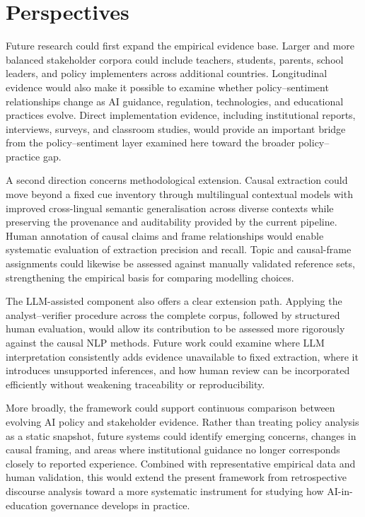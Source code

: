 \section{Perspectives}

Future research could first expand the empirical evidence base. Larger and more
balanced stakeholder corpora could include teachers, students, parents, school
leaders, and policy implementers across additional countries. Longitudinal evidence
would also make it possible to examine whether policy--sentiment relationships change
as AI guidance, regulation, technologies, and educational practices evolve. Direct
implementation evidence, including institutional reports, interviews, surveys, and
classroom studies, would provide an important bridge from the policy--sentiment layer
examined here toward the broader policy--practice gap.

A second direction concerns methodological extension. Causal extraction could move
beyond a fixed cue inventory through multilingual contextual models with improved
cross-lingual semantic generalisation across diverse contexts while preserving the
provenance and auditability provided by the current pipeline. Human annotation of
causal claims and frame relationships would enable systematic evaluation of
extraction precision and recall. Topic and causal-frame assignments could likewise
be assessed against manually validated reference sets, strengthening the empirical
basis for comparing modelling choices.

The LLM-assisted component also offers a clear extension path. Applying the
analyst--verifier procedure across the complete corpus, followed by structured human
evaluation, would allow its contribution to be assessed more rigorously against the
causal NLP methods. Future work could examine where LLM interpretation consistently
adds evidence unavailable to fixed extraction, where it introduces unsupported
inferences, and how human review can be incorporated efficiently without weakening
traceability or reproducibility.

More broadly, the framework could support continuous comparison between evolving AI
policy and stakeholder evidence. Rather than treating policy analysis as a static
snapshot, future systems could identify emerging concerns, changes in causal framing,
and areas where institutional guidance no longer corresponds closely to reported
experience. Combined with representative empirical data and human validation, this
would extend the present framework from retrospective discourse analysis toward a
more systematic instrument for studying how AI-in-education governance develops in
practice.